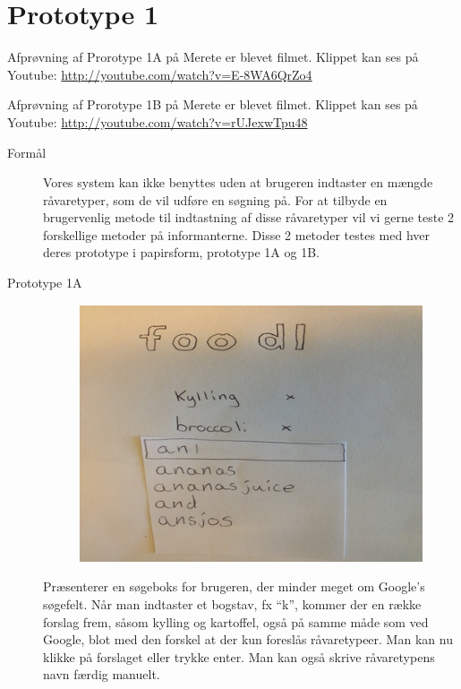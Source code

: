 \section{Prototype 1}
\label{ap:prototype1}

Afprøvning af Prorotype 1A på Merete er blevet filmet. Klippet kan ses på Youtube: \url{http://youtube.com/watch?v=E-8WA6QrZo4}

Afprøvning af Prorotype 1B på Merete er blevet filmet. Klippet kan ses på Youtube: \url{http://youtube.com/watch?v=rUJexwTpu48}

\begin{description}
\item[Formål] Vores system kan ikke benyttes uden at brugeren indtaster en mængde råvaretyper, som de vil udføre en søgning på. For at tilbyde en brugervenlig metode til indtastning af disse råvaretyper vil vi gerne teste 2 forskellige metoder på informanterne. Disse 2 metoder testes med hver deres prototype i papirsform, prototype 1A og 1B.
\item[Prototype 1A]

\begin{figure}[H]
\centering
\includegraphics[scale=0.7]{billeder/prototyper/prototype1a.png}
\label{fig:prototype1a}
\end{figure}

Præsenterer en søgeboks for brugeren, der minder meget om Google’s søgefelt. Når man indtaster et bogstav, fx “k”, kommer der en række forslag frem, såsom kylling og kartoffel, også på samme måde som ved Google, blot med den forskel at der kun foreslås råvaretypeer. Man kan nu klikke på forslaget eller trykke enter. Man kan også skrive råvaretypens navn færdig manuelt.


\end{description}
